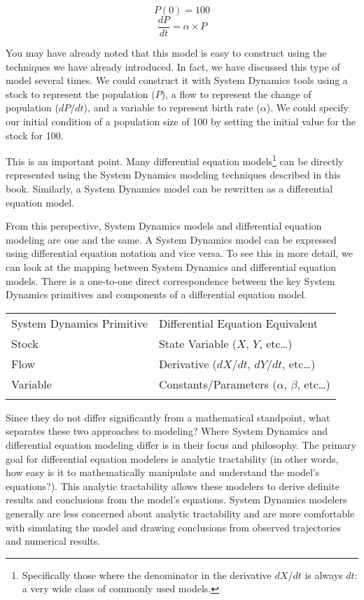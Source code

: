 \documentclass[]{memoir}
\begin{document}
\[ P(0) = 100 \] \[ \frac{dP}{dt} = \alpha \times P \]

You may have already noted that this model is easy to construct using
the techniques we have already introduced. In fact, we have discussed
this type of model several times. We could construct it with System
Dynamics tools using a stock to represent the population ($P$), a flow
to represent the change of population ($dP/dt$), and a variable to
represent birth rate ($\alpha$). We could specify our initial condition
of a population size of 100 by setting the initial value for the stock
for 100.

This is an important point. Many differential equation models\footnote{Specifically
  those where the denominator in the derivative $dX/dt$ is always $dt$:
  a very wide class of commonly used models.} can be directly
represented using the System Dynamics modeling techniques described in
this book. Similarly, a System Dynamics model can be rewritten as a
differential equation model.

From this perspective, System Dynamics models and differential equation
modeling are one and the same. A System Dynamics model can be expressed
using differential equation notation and vice versa. To see this in more
detail, we can look at the mapping between System Dynamics and
differential equation models. There is a one-to-one direct
correspondence between the key System Dynamics primitives and components
of a differential equation model.

\begin{longtable}[c]{@{}ll@{}}
\hline\noalign{\medskip}
System Dynamics Primitive & Differential Equation Equivalent
\\\noalign{\medskip}
\hline\noalign{\medskip}
Stock & State Variable ($X$, $Y$, etc\ldots{})
\\\noalign{\medskip}
Flow & Derivative ($dX/dt$, $dY/dt$, etc\ldots{})
\\\noalign{\medskip}
Variable & Constants/Parameters ($\alpha$, $\beta$, etc\ldots{})
\\\noalign{\medskip}
\hline
\end{longtable}

Since they do not differ significantly from a mathematical standpoint,
what separates these two approaches to modeling? Where System Dynamics
and differential equation modeling differ is in their focus and
philosophy. The primary goal for differential equation modelers is
analytic tractability (in other words, how easy is it to mathematically
manipulate and understand the model's equations?). This analytic
tractability allows these modelers to derive definite results and
conclusions from the model's equations. System Dynamics modelers
generally are less concerned about analytic tractability and are more
comfortable with simulating the model and drawing conclusions from
observed trajectories and numerical results.
\end{document}
